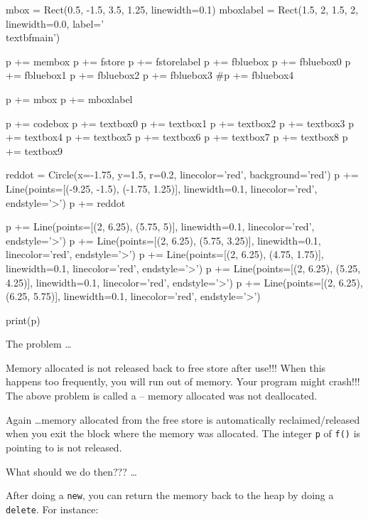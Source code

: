 \begin{python}
mbox = Rect(0.5, -1.5, 3.5, 1.25, linewidth=0.1)
mboxlabel = Rect(1.5, 2, 1.5, 2, linewidth=0.0, label='\\textbf{main}')

p += membox
p += fstore
p += fstorelabel
p += fbluebox
p += fbluebox0
p += fbluebox1
p += fbluebox2
p += fbluebox3
#p += fbluebox4

p += mbox
p += mboxlabel

p += codebox
p += textbox0
p += textbox1
p += textbox2
p += textbox3
p += textbox4
p += textbox5
p += textbox6
p += textbox7
p += textbox8
p += textbox9

reddot = Circle(x=-1.75, y=1.5, r=0.2, linecolor='red', background='red')
p += Line(points=[(-9.25, -1.5), (-1.75, 1.25)], linewidth=0.1, linecolor='red', endstyle='>')
p += reddot

p += Line(points=[(2, 6.25), (5.75, 5)], linewidth=0.1, linecolor='red', endstyle='>')
p += Line(points=[(2, 6.25), (5.75, 3.25)], linewidth=0.1, linecolor='red', endstyle='>')
p += Line(points=[(2, 6.25), (4.75, 1.75)], linewidth=0.1, linecolor='red', endstyle='>')
p += Line(points=[(2, 6.25), (5.25, 4.25)], linewidth=0.1, linecolor='red', endstyle='>')
p += Line(points=[(2, 6.25), (6.25, 5.75)], linewidth=0.1, linecolor='red', endstyle='>')

print(p)
\end{python}

The problem \ldots

Memory allocated is not released back to free store after use!!! When this happens too frequently, you will run out of memory. Your program might crash!!! The above problem is called a  -- memory allocated was not deallocated.


Again \ldots memory allocated from the free store is  automatically reclaimed/released when you exit the block where the memory was allocated. The integer \texttt{p} of \texttt{f()} is pointing to is not released.

What should we do then??? \ldots

\newpage{}

After doing a \texttt{new}, you can return the memory back to the heap by
doing a \texttt{delete}. For instance:



